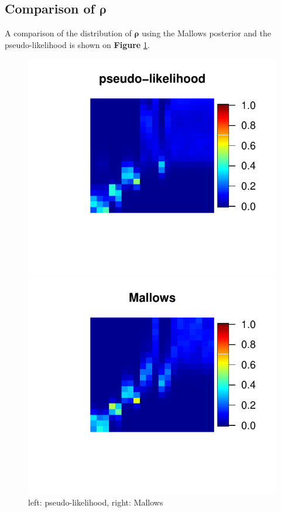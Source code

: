 \documentclass[11pt, oneside]{article}   	%
\begin{document}
\subsection{Comparison of $\bm{\rho}$}
A comparison of the distribution of $\bm{\rho}$ using the Mallows posterior and the pseudo-likelihood is shown on \textbf{Figure} \ref{fig:heat_rho}.
\begin{figure}[hbt!]
	\begin{minipage}[t]{.45\textwidth}
		\centering
		\includegraphics[width=\textwidth]{figures/clicking/Pseudo_rho_heat}
		
	\end{minipage}
	\hfill
	\begin{minipage}[t]{.45\textwidth}
		\centering
		\includegraphics[width=\textwidth]{figures/clicking/Mallows_rho_heat}
		
	\end{minipage} 
	\caption{left: pseudo-likelihood, right: Mallows}
	\label{fig:heat_rho}
\end{figure}
\end{document}
